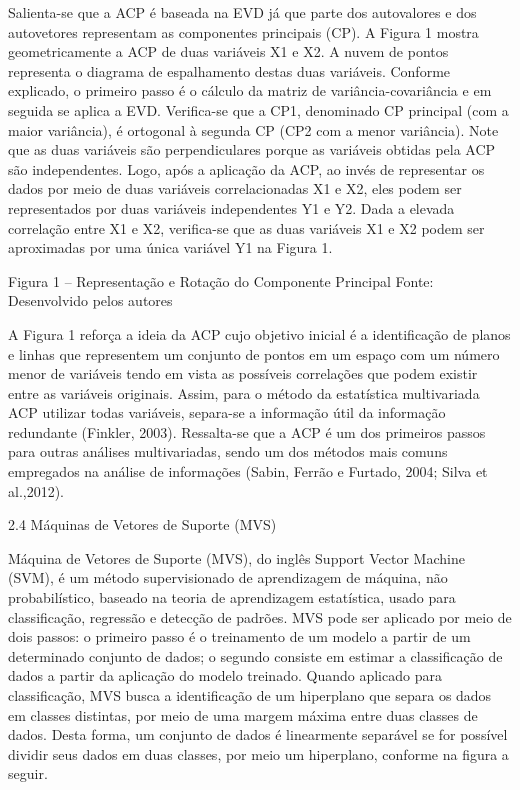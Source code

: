 Salienta-se que a ACP é baseada na EVD já que parte dos autovalores e dos autovetores representam as componentes principais (CP). 
A Figura 1 mostra geometricamente a ACP de duas variáveis X1 e X2. A nuvem de pontos representa o diagrama de espalhamento destas duas variáveis. Conforme explicado, o primeiro passo é o cálculo da matriz de variância-covariância e em seguida se aplica a EVD. Verifica-se que a CP1, denominado CP principal (com a maior variância), é ortogonal à segunda CP (CP2 com a menor variância). Note que as duas variáveis são perpendiculares porque as variáveis obtidas pela ACP são independentes. Logo, após a aplicação da ACP, ao invés de representar os dados por meio de duas variáveis correlacionadas X1 e X2, eles podem ser representados por duas variáveis independentes Y1 e Y2. Dada a elevada correlação entre X1 e X2, verifica-se que as duas variáveis X1 e X2 podem ser aproximadas por uma única variável Y1 na Figura 1.

Figura 1 – Representação e Rotação do Componente Principal
Fonte: Desenvolvido pelos autores

A Figura 1 reforça a ideia da ACP cujo objetivo inicial é a identificação de planos e linhas que representem um conjunto de pontos em um espaço com um número menor de variáveis tendo em vista as possíveis correlações que podem existir entre as variáveis originais.
Assim, para o método da estatística multivariada ACP utilizar todas variáveis, separa-se a informação útil da informação redundante (Finkler, 2003). Ressalta-se que a ACP é um dos primeiros passos para outras análises multivariadas, sendo um dos métodos mais comuns empregados na análise de informações (Sabin, Ferrão e Furtado, 2004; Silva et al.,2012).

2.4 Máquinas de Vetores de Suporte (MVS)

Máquina de Vetores de Suporte (MVS), do inglês Support Vector Machine (SVM), é um método supervisionado de aprendizagem de máquina, não probabilístico, baseado na teoria de aprendizagem estatística, usado para classificação, regressão e detecção de padrões. MVS pode ser aplicado por meio de dois passos: o primeiro passo é o treinamento de um modelo a partir de um determinado conjunto de dados; o segundo consiste em estimar a classificação de dados a partir da aplicação do modelo treinado. 
Quando aplicado para classificação, MVS busca a identificação de um hiperplano que separa os dados em classes distintas, por meio de uma margem máxima entre duas classes de dados. Desta forma, um conjunto de dados é linearmente separável se for possível dividir seus dados em duas classes, por meio um hiperplano, conforme na figura a seguir. 

